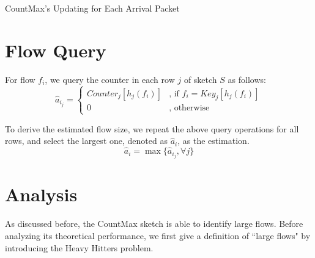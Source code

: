 \begin{algorithm}
	\caption{CountMax's Updating for Each Arrival Packet}
	\label{alg:count_max}
	\begin{algorithmic}[1]
		\ELSE
		\ELSE
		\ENDIF
		\ENDIF
		\ENDFOR
	\end{algorithmic}
\end{algorithm}



\section{Flow Query}
%
For flow $f_i$, we query the counter in each row $j$ of sketch $S$ as follows:
\begin{equation}
\hat{a}_{i_{j}}=\left\{
\begin{aligned}
Counter_{j}[h_j(f_i)]&\text{, if $f_i=Key_{j}[h_j(f_i)]$}\\
0&\text{, otherwise}
\end{aligned}
\right.
\end{equation}

To derive the estimated flow size, we repeat the above query operations for all rows, and select the largest one, denoted as $\hat{a}_{i}$, as the estimation.
\begin{equation}
\label{eq:query}
\hat{a}_{i}=\max{\{\hat{a}_{i_{j}} , \forall j\}}
\end{equation}


\section{Analysis}
\label{subsec:analysis}
%

As discussed before, the CountMax sketch is able to identify large flows. Before analyzing its theoretical performance, we first give a definition of ``large flows" by introducing the Heavy Hitters problem.

